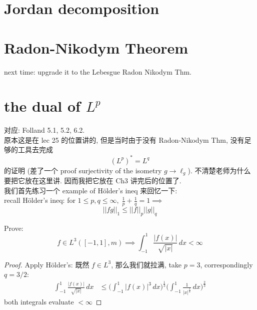 \documentclass[lang=cn,11pt]{elegantbook}
\begin{document}
\chapter{Jordan decomposition}








\chapter{Radon-Nikodym Theorem}







next time: upgrade it to the Lebesgue Radon Nikodym Thm.













\chapter{the dual of $L^p$}
对应: Folland 5.1, 5.2, 6.2.\\
原本这是在 lec 25 的位置讲的, 但是当时由于没有 Radon-Nikodym Thm, 没有足够的工具去完成 \[
(L^p)^* = L^q
\]
的证明 (差了一个 proof surjectivity of the isometry $g \to \ell_g$). 不清楚老师为什么要把它放在这里讲. 因而我把它放在 Ch3 讲完后的位置了.\\
我们首先练习一个 example of Hölder's ineq 来回忆一下:\\
recall Hölder's ineq: for $1\leq p,q\leq\infty,\; \frac{1}{p}+\frac{1}{q} = 1\implies$ \[
||fg||_1 \leq ||f||_p ||g||_q
\]
\begin{example}
Prove:\[
    f \in L^3 ([-1,1],m)\implies \int_{-1}^1 \frac{|f(x)|}{\sqrt{|x|}} \,dx < \infty
    \]
\begin{proof}
    Apply Hölder's: 既然 $f\in L^3$, 那么我们就拉满, take $p=3$, correspondingly $ q=3/2$:\begin{align}
        \int_{-1}^1 \frac{|f(x)|}{\sqrt{|x|}} \,dx   &\leq \bigg(\int_{-1}^1 |f(x)|^3\, dx\bigg)^\frac{1}{3} \bigg(\int_{-1}^1  \frac{1}{|x|^{\frac{3}{4}}} \,dx    \bigg)^\frac{2}{3}
    \end{align} both integrals evaluate $<\infty$
\end{proof}
\end{example}
\end{document}

